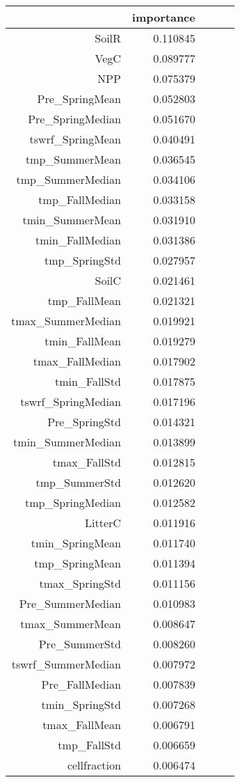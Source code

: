 \begin{tabular}{rrrrr}
\toprule
 & importance \\
\midrule
SoilR & 0.110845 \\
VegC & 0.089777 \\
NPP & 0.075379 \\
Pre_SpringMean & 0.052803 \\
Pre_SpringMedian & 0.051670 \\
tswrf_SpringMean & 0.040491 \\
tmp_SummerMean & 0.036545 \\
tmp_SummerMedian & 0.034106 \\
tmp_FallMedian & 0.033158 \\
tmin_SummerMean & 0.031910 \\
tmin_FallMedian & 0.031386 \\
tmp_SpringStd & 0.027957 \\
SoilC & 0.021461 \\
tmp_FallMean & 0.021321 \\
tmax_SummerMedian & 0.019921 \\
tmin_FallMean & 0.019279 \\
tmax_FallMedian & 0.017902 \\
tmin_FallStd & 0.017875 \\
tswrf_SpringMedian & 0.017196 \\
Pre_SpringStd & 0.014321 \\
tmin_SummerMedian & 0.013899 \\
tmax_FallStd & 0.012815 \\
tmp_SummerStd & 0.012620 \\
tmp_SpringMedian & 0.012582 \\
LitterC & 0.011916 \\
tmin_SpringMean & 0.011740 \\
tmp_SpringMean & 0.011394 \\
tmax_SpringStd & 0.011156 \\
Pre_SummerMedian & 0.010983 \\
tmax_SummerMean & 0.008647 \\
Pre_SummerStd & 0.008260 \\
tswrf_SummerMedian & 0.007972 \\
Pre_FallMedian & 0.007839 \\
tmin_SpringStd & 0.007268 \\
tmax_FallMean & 0.006791 \\
tmp_FallStd & 0.006659 \\
cellfraction & 0.006474 \\

\end{tabular}
